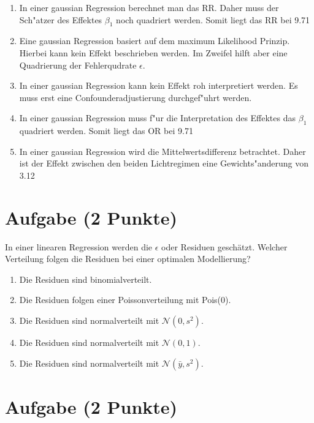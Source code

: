 \documentclass[a4paper, 10pt]{scrartcl}\usepackage[]{graphicx}\usepackage[]{xcolor}
\begin{document}
\begin{enumerate}
\item [\textbf{A} \msquare] In einer gaussian Regression berechnet man das RR. Daher muss der Sch{"a}tzer des Effektes $\beta_1$ noch quadriert werden. Somit liegt das RR bei 9.71
\item [\textbf{B} \msquare] Eine gaussian Regression basiert auf dem maximum Likelihood Prinzip. Hierbei kann kein Effekt beschrieben werden. Im Zweifel hilft aber eine Quadrierung der Fehlerqudrate $\epsilon$.
\item [\textbf{C} \msquare] In einer gaussian Regression kann kein Effekt roh interpretiert werden. Es muss erst eine Confounderadjustierung durchgef{"u}hrt werden.
\item [\textbf{D} \msquare] In einer gaussian Regression muss f{"u}r die Interpretation des Effektes das $\beta_1$ quadriert werden. Somit liegt das OR bei 9.71
\item [\textbf{E} \msquare] In einer gaussian Regression wird die Mittelwertsdifferenz betrachtet. Daher ist der Effekt zwischen den beiden Lichtregimen eine Gewichts{"a}nderung von 3.12
\end{enumerate}

\section{Aufgabe \hfill (2 Punkte)}

In einer linearen Regression werden die $\epsilon$ oder Residuen
gesch{\"a}tzt. Welcher Verteilung folgen die Residuen bei einer optimalen
Modellierung? 



\begin{enumerate}
\item [\textbf{A} \msquare] Die Residuen sind binomialverteilt.
\item [\textbf{B} \msquare] Die Residuen folgen einer Poissonverteilung mit Pois(0).
\item [\textbf{C} \msquare] Die Residuen sind normalverteilt mit $\mathcal{N}(0, s^2)$.
\item [\textbf{D} \msquare] Die Residuen sind normalverteilt mit $\mathcal{N}(0, 1)$.
\item [\textbf{E} \msquare] Die Residuen sind normalverteilt mit $\mathcal{N}(\bar{y}, s^2)$.
\end{enumerate}

\section{Aufgabe \hfill (2 Punkte)}
\end{document}
